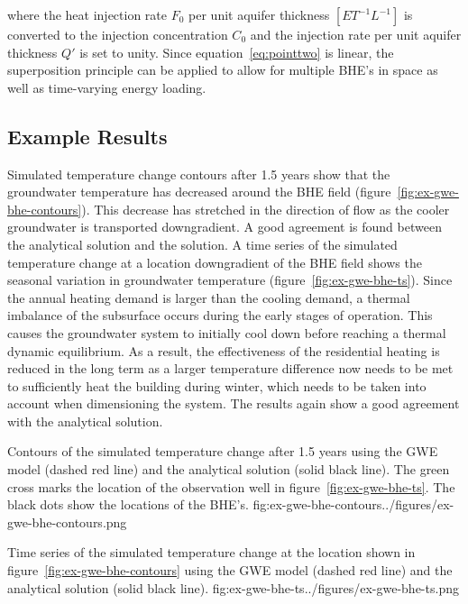 where the heat injection rate $F_0$ per unit aquifer thickness $[ET^{-1}L^{-1}]$ is converted to the injection concentration $C_0$ and the injection rate per unit aquifer thickness $Q'$ is set to unity. Since equation~\ref{eq:pointtwo} is linear, the superposition principle can be applied to allow for multiple BHE's in space as well as time-varying energy loading.

\subsection{Example Results}

Simulated temperature change contours after 1.5 years show that the groundwater temperature has decreased around the BHE field (figure~\ref{fig:ex-gwe-bhe-contours}). This decrease has stretched in the direction of flow as the cooler groundwater is transported downgradient. A good agreement is found between the analytical solution and the \mf solution. A time series of the simulated temperature change at a location downgradient of the BHE field shows the seasonal variation in groundwater temperature (figure~\ref{fig:ex-gwe-bhe-ts}). Since the annual heating demand is larger than the cooling demand, a thermal imbalance of the subsurface occurs during the early stages of operation. This causes the groundwater system to initially cool down before reaching a thermal dynamic equilibrium. As a result, the effectiveness of the residential heating is reduced in the long term as a larger temperature difference now needs to be met to sufficiently heat the building during winter, which needs to be taken into account when dimensioning the system. The \mf results again show a good agreement with the analytical solution.

\begin{StandardFigure}{
    Contours of the simulated temperature change after 1.5 years using the \mf GWE model (dashed red line) and the analytical solution (solid black line). The green cross marks the location of the observation well in figure~\ref{fig:ex-gwe-bhe-ts}. The black dots show the locations of the BHE's.
    }{fig:ex-gwe-bhe-contours}{../figures/ex-gwe-bhe-contours.png}
\end{StandardFigure}                                 

\begin{StandardFigure}{
    Time series of the simulated temperature change at the location shown in figure~\ref{fig:ex-gwe-bhe-contours} using the \mf GWE model (dashed red line) and the analytical solution (solid black line). 
    }{fig:ex-gwe-bhe-ts}{../figures/ex-gwe-bhe-ts.png}
\end{StandardFigure}    
